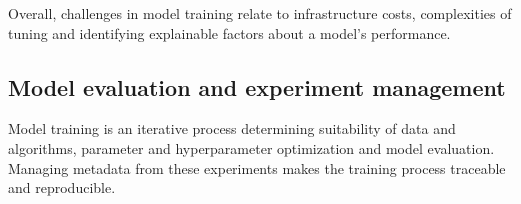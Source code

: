 
Overall, challenges in model training relate to infrastructure costs, complexities of tuning and identifying explainable factors about a model's performance. 

\subsection{Model evaluation and experiment management}
Model training is \DIFdelbegin {}\DIFdelend an iterative process \DIFdelbegin {}\DIFdelend \DIFaddbegin {}\DIFaddend determining suitability of data and algorithms, \DIFdelbegin {}\DIFdelend parameter and hyperparameter optimization and \DIFdelbegin {}\DIFdelend model evaluation. 
Managing metadata from these experiments makes the training process traceable and reproducible.

